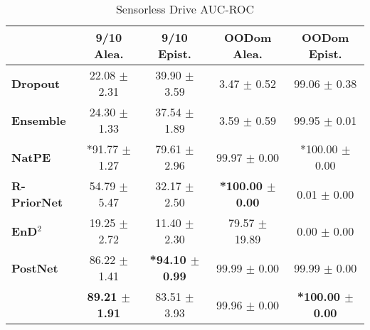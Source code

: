 \begin{table*}[ht]
    \caption{Sensorless Drive AUC-ROC}
    \centering
    \scriptsize
    \begin{tabular}{lcccc}
        \toprule
        & \textbf{9/10 Alea.} & \textbf{9/10 Epist.} & \textbf{OODom Alea.} & \textbf{OODom Epist.} \\
        \midrule
        \textbf{Dropout} & 22.08 $\pm$ 2.31 & 39.90 $\pm$ 3.59 & 3.47 $\pm$ 0.52 & 99.06 $\pm$ 0.38 \\
        \textbf{Ensemble} & 24.30 $\pm$ 1.33 & 37.54 $\pm$ 1.89 & 3.59 $\pm$ 0.59 & 99.95 $\pm$ 0.01 \\
        \textbf{NatPE} & *91.77 $\pm$ 1.27 & 79.61 $\pm$ 2.96 & 99.97 $\pm$ 0.00 & *100.00 $\pm$ 0.00 \\
        \midrule
        \textbf{R-PriorNet} & 54.79 $\pm$ 5.47 & 32.17 $\pm$ 2.50 & \textbf{*100.00 $\pm$ 0.00} & 0.01 $\pm$ 0.00 \\
        \textbf{EnD$^2$} & 19.25 $\pm$ 2.72 & 11.40 $\pm$ 2.30 & 79.57 $\pm$ 19.89 & 0.00 $\pm$ 0.00 \\
        \textbf{PostNet} & 86.22 $\pm$ 1.41 & \textbf{*94.10 $\pm$ 0.99} & 99.99 $\pm$ 0.00 & 99.99 $\pm$ 0.00 \\
        \textbf{\oursacro{}} & \textbf{89.21 $\pm$ 1.91} & 83.51 $\pm$ 3.93 & 99.96 $\pm$ 0.00 & \textbf{*100.00 $\pm$ 0.00} \\
        \bottomrule
    \end{tabular}
\end{table*}
